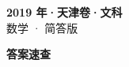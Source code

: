 \documentclass[zihao=-4, a4paper]{ctexart}
\begin{document}
\begin{center}
  {\Large\bfseries 2019 年·天津卷·文科}\\[4pt]
  {\large 数学 · 简答版}
\end{center}
\medskip
{}

\clearpage
{}
\begin{center}{\Large\bfseries 答案速查}\end{center}
\medskip

\end{document}
